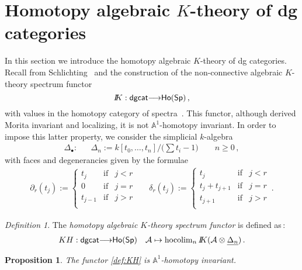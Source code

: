 \documentclass{amsart}
\numberwithin{equation}{subsection}
\newtheorem{proposition}[theorem]{Proposition}
\theoremstyle{remark}
\newtheorem{definition}[theorem]{Definition}
\theoremstyle{remark}
\theoremstyle{remark}
\theoremstyle{remark}
\begin{document}
\section{Homotopy algebraic $K$-theory of dg categories}\label{sec:KH}
In this section we introduce the homotopy algebraic $K$-theory of dg categories. Recall from Schlichting~\cite[\S12.1]{Negative} and \cite[Notation~2.38]{CT} the construction of the non-connective algebraic $K$-theory spectrum functor
\begin{equation}\label{eq:non-con}
{I\mspace{-6.mu}K}: {\mathsf{dgcat}} {\longrightarrow} {\mathsf{Ho}}({\mathsf{Sp}})\,,
\end{equation}
with values in the homotopy category of spectra~\cite{BF}. This functor, although derived Morita invariant and localizing, it is not  ${\mathbb{A}}^1$-homotopy invariant. In order to impose this latter property, we consider the simplicial $k$-algebra
\begin{eqnarray*}
\Delta_{\bullet}:&& \Delta_n:= k[t_0, \ldots, t_n]/ \big(\sum t_i -1\big) \qquad n \geq 0\,,
\end{eqnarray*}
with faces and degenerancies given by the formulae
\begin{eqnarray*}
\partial_r(t_j) := \left\{ \begin{array}{lcr}
t_j & \text{if} & j <r \\
0 & \text{if} & j =r \\
t_{j-1} & \text{if} & j > r \\
\end{array} \right.
&
&
\delta_r(t_j) := \left\{ \begin{array}{lcr}
t_j & \text{if} & j <r \\
t_j + t_{j+1} & \text{if} & j =r \\
t_{j+1} & \text{if} & j > r \\
\end{array} \right.\,.
\end{eqnarray*}
\begin{definition}
The {\em homotopy algebraic $K$-theory spectrum functor} is defined as\,:
\begin{eqnarray}\label{def:KH}
KH: {\mathsf{dgcat}} {\longrightarrow} {\mathsf{Ho}}({\mathsf{Sp}}) && {{\mathcal A}} \mapsto \mathrm{hocolim}_n\, {I\mspace{-6.mu}K}({{\mathcal A}} \otimes \underline{\Delta_n})\,.
\end{eqnarray}
\end{definition}
\begin{proposition}\label{prop:KH-A1}
The functor \eqref{def:KH} is ${\mathbb{A}}^1$-homotopy invariant.
\end{proposition}
\end{document}
